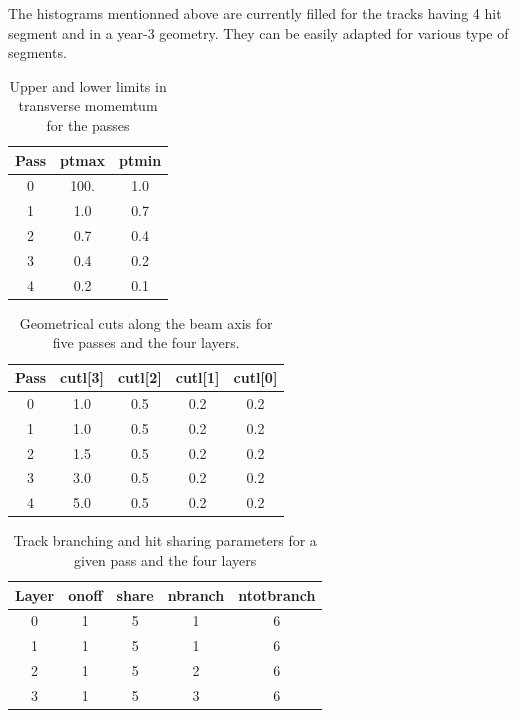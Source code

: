 \documentclass[twoside]{article}
\begin{document}
The histograms mentionned above are currently filled for the tracks
having 4 hit segment and in a year-3 geometry. They can be easily
adapted for various type of segments.


\begin{table}[ht]
\begin{center}
\begin{tabular}{|c|c|c|}\hline
Pass & ptmax & ptmin \\ \hline 
0 & 100. & 1.0 \\ \hline 
1 & 1.0 & 0.7
\\ \hline 
2 & 0.7 & 0.4 \\ \hline 
3 & 0.4 & 0.2 \\ \hline 
4 & 0.2 & 0.1 \\ \hline
\end{tabular}
\end{center}
\label{tab:passes_pt}
\caption{Upper and lower limits in transverse momemtum for the passes}
\end{table}

\begin{table}[ht]
\begin{center}
\begin{tabular}{|c|c|c|c|c|}\hline
Pass & cutl[3] & cutl[2] & cutl[1] & cutl[0] 
\\ \hline 
0 & 1.0 & 0.5 & 0.2 & 0.2 \\ \hline 
1 & 1.0 & 0.5 & 0.2 & 0.2 \\ \hline 
2 & 1.5 & 0.5 & 0.2 & 0.2 \\ \hline 
3 & 3.0 & 0.5 & 0.2 & 0.2 \\ \hline 
4 & 5.0 & 0.5 & 0.2 & 0.2 \\ \hline
\end{tabular}
\end{center}
\caption{Geometrical cuts along the beam axis for five passes and the four layers.}
\label{tab:geo}
\end{table}

\begin{table}[h]
\begin{center}
\begin{tabular}{|c|c|c|c|c|}\hline
Layer & onoff & share & nbranch & ntotbranch 
\\ \hline 
0 & 1 & 5 & 1 & 6 \\ \hline 
1 & 1 & 5 & 1 & 6 \\ \hline 
2 & 1 & 5 & 2 & 6 \\ \hline 
3 & 1 & 5 & 3 & 6 \\ \hline 
\end{tabular}
\end{center}
\caption{Track branching and hit sharing parameters for a given pass and the four layers}
\label{tab:bra}
\end{table}
\end{document}
